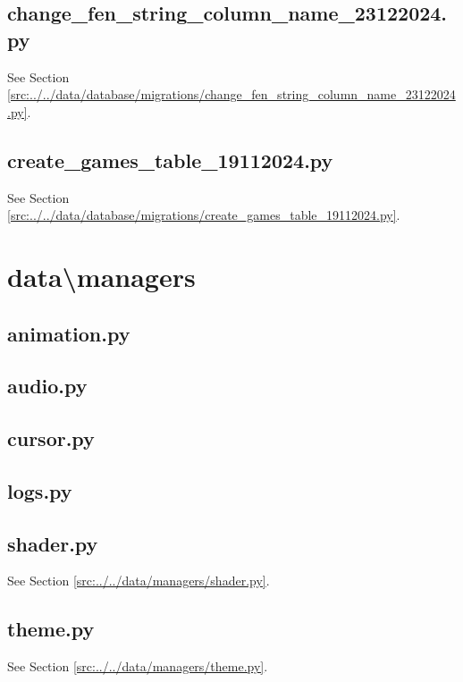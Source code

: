 \documentclass[../main/main.tex]{subfiles}
\begin{document}
\subsection{change\_fen\_string\_column\_name\_23122024.py}
See Section \ref{src:../../data/database/migrations/change_fen_string_column_name_23122024.py}.

\subsection{create\_games\_table\_19112024.py}
See Section \ref{src:../../data/database/migrations/create_games_table_19112024.py}.

\section{data\textbackslash managers}
\subsection{animation.py}

\label{src:data/managers/animation.py}

\subsection{audio.py}

\label{src:data/managers/audio.py}

\subsection{cursor.py}

\label{src:data/managers/cursor.py}

\subsection{logs.py}

\label{src:data/managers/logs.py}

\subsection{shader.py}
See Section \ref{src:../../data/managers/shader.py}.

\subsection{theme.py}
See Section \ref{src:../../data/managers/theme.py}.
\end{document}
